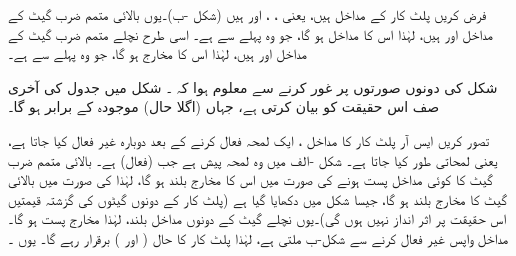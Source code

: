 فرض کریں پلٹ کار کے مداخل   ہیں، یعنی   ،  ،  اور  ہیں (شکل -ب)۔یوں بالائی متمم  ضرب گیٹ کے  مداخل  اور  ہیں، لہٰذا اس کا مداخل  ہو گا، جو وہ پہلے سے ہے۔ اسی طرح نچلے متمم ضرب گیٹ کے مداخل  اور  ہیں، لہٰذا اس کا مخارج  ہو گا، جو وہ پہلے سے ہے۔

 شکل  کی دونوں صورتوں پر غور کرنے سے معلوم ہوا کہ  ۔  شکل  میں جدول کی  آخری صف  اس حقیقت کو بیان کرتی ہے، جہاں (اگلا حال)    موجودہ    کے برابر ہو گا۔

 
تصور کریں   ایس آر پلٹ کار کا مداخل  ،    ایک لمحہ  فعال  کرنے کے بعد دوبارہ غیر فعال کیا جاتا ہے، یعنی لمحاتی طور  کیا جاتا ہے۔  شکل -الف میں وہ لمحہ پیش ہے جب   (فعال) ہے۔ بالائی متمم ضرب گیٹ کا  کوئی  مداخل پست ہونے کی صورت میں اس کا مخارج بلند ہو گا، لہٰذا  کی صورت میں بالائی گیٹ کا مخارج بلند ہو گا، جیسا  شکل میں دکھایا گیا ہے (پلٹ کار کے دونوں گیٹوں کی گزشتہ قیمتیں اس حقیقت پر اثر انداز نہیں ہوں گی)۔یوں نچلے گیٹ کے دونوں مداخل بلند، لہٰذا مخارج پست    ہو گا۔ مداخل واپس غیر فعال  کرنے سے شکل-ب ملتی  ہے،  لہٰذا  پلٹ کار کا حال  ( اور ) برقرار رہے  گا۔  یوں  ۔

